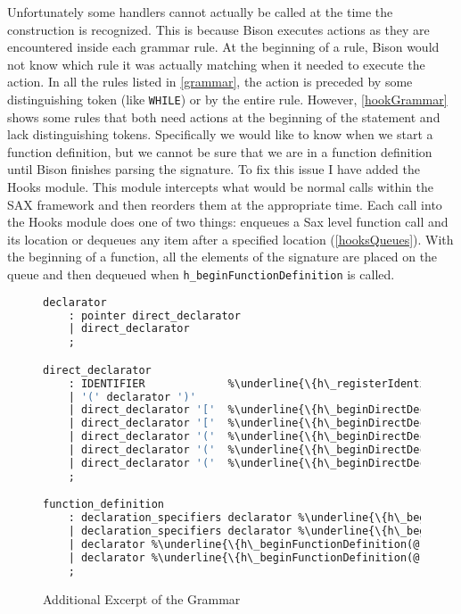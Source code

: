 \documentclass[12pt]{report}
\begin{document}
Unfortunately some handlers cannot actually be called at the time the construction is recognized. This 
is because Bison executes actions as they are encountered inside each grammar rule. At the 
beginning of a rule, Bison would not know which rule it was actually matching when it needed to 
execute the action. In all the rules listed in \autoref{grammar}, the action is preceded by some 
distinguishing token (like \lstinline{WHILE}) or by the entire rule. However, \autoref{hookGrammar} 
shows some rules that both need actions at the beginning of the statement and lack distinguishing 
tokens. Specifically we would like to know when we start a function definition, but we cannot be sure that 
we are in a function definition until Bison finishes parsing the signature. To fix this issue I have added the 
Hooks module. This module intercepts what would be normal calls within the SAX framework and then 
reorders them at the appropriate time. Each call into the Hooks module does one of two things: 
enqueues a Sax level function call and its location or dequeues any item after a specified location 
(\autoref{hooksQueues}). With the beginning of a function, all the elements of the signature are placed 
on the queue and then dequeued when \lstinline{h_beginFunctionDefinition} is called. 


\begin{figure}
\begin{lstlisting}[language=Caml, escapechar=\%]
declarator
	: pointer direct_declarator
	| direct_declarator
	;

direct_declarator
	: IDENTIFIER			 %\underline{\{h\_registerIdentifier(@\$);\}}%
	| '(' declarator ')'
	| direct_declarator '['  %\underline{\{h\_beginDirectDeclarator(@1);\}}% constant_expression ']'	 %\underline{\{h\_endDirectDeclarator(@\$);\}}%
	| direct_declarator '['  %\underline{\{h\_beginDirectDeclarator(@1);\}}% ']'						%\underline{\{h\_endDirectDeclarator(@\$);\}}%
	| direct_declarator '('  %\underline{\{h\_beginDirectDeclarator(@1);\}}% parameter_type_list ')'	%\underline{\{h\_endDirectDeclarator(@\$);\}}%
	| direct_declarator '('  %\underline{\{h\_beginDirectDeclarator(@1);\}}% identifier_list ')'		%\underline{\{h\_endDirectDeclarator(@\$);\}}%
	| direct_declarator '('  %\underline{\{h\_beginDirectDeclarator(@1);\}}% ')'						%\underline{\{h\_endDirectDeclarator(@\$);\}}%
	;

function_definition
	: declaration_specifiers declarator %\underline{\{h\_beginFunctionDefinition(@2);\}}% declaration_list compound_statement %\underline{\{endFunctionDefinition(@\$);\}}%
	| declaration_specifiers declarator %\underline{\{h\_beginFunctionDefinition(@2);\}}%} compound_statement %\underline{\{endFunctionDefinition(@\$);\}}%
	| declarator %\underline{\{h\_beginFunctionDefinition(@1);\}}% declaration_list compound_statement %\underline{\{endFunctionDefinition(@\$);\}}%
	| declarator %\underline{\{h\_beginFunctionDefinition(@1);\}}% compound_statement %\underline{\{endFunctionDefinition(@\$);\}}
	;
\end{lstlisting}
\caption{Additional Excerpt of the Grammar}
\label{hookGrammar}
\end{figure}
\end{document}
